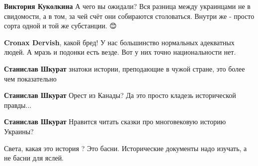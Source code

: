 \begin{itemize}
\begin{itemize}
 
\textbf{Виктория Куколкина} А чего вы ожидали? Вся разница между украинцами не в свидомости, а в том, за чей счёт они собираются столоваться. Внутри же - просто сорта одной и той же субстанции. 😊

 
\textbf{Cronax Dervish}, какой бред! У нас большинство нормальных адекватных людей. А мразь и подонки есть везде. Вот у них точно национальности нет.

 
\textbf{Станислав Шкурат} знатоки истории, преподающие в чужой стране, это более чем показательно

 
\textbf{Станислав Шкурат} Орест из Канады? Да это просто кладезь исторической правды...

 
\textbf{Станислав Шкурат} Нравится читать сказки про многовековую историю Украины?

 
Света, какая это история ? Это басни. Исторические документы надо изучать, а не басни для яслей.


\end{itemize}
\end{itemize}
